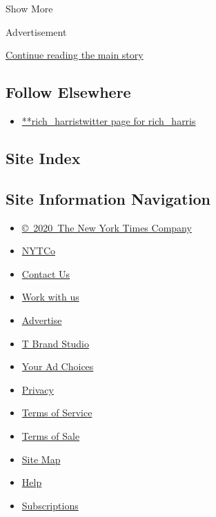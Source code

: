 Show More

Advertisement

\protect\hyperlink{after-mid2}{Continue reading the main story}

\hypertarget{follow-elsewhere}{%
\subsection{Follow Elsewhere}\label{follow-elsewhere}}

\begin{itemize}
\tightlist
\item
  \href{https://twitter.com/rich_harris}{**rich\_harristwitter page for
  rich\_harris}
\end{itemize}

\hypertarget{site-index}{%
\subsection{Site Index}\label{site-index}}

\hypertarget{site-information-navigation}{%
\subsection{Site Information
Navigation}\label{site-information-navigation}}

\begin{itemize}
\tightlist
\item
  \href{https://help.nytimes.com/hc/en-us/articles/115014792127-Copyright-notice}{©~2020~The
  New York Times Company}
\end{itemize}

\begin{itemize}
\tightlist
\item
  \href{https://www.nytco.com/}{NYTCo}
\item
  \href{https://help.nytimes.com/hc/en-us/articles/115015385887-Contact-Us}{Contact
  Us}
\item
  \href{https://www.nytco.com/careers/}{Work with us}
\item
  \href{https://nytmediakit.com/}{Advertise}
\item
  \href{http://www.tbrandstudio.com/}{T Brand Studio}
\item
  \href{https://www.nytimes.com/privacy/cookie-policy\#how-do-i-manage-trackers}{Your
  Ad Choices}
\item
  \href{https://www.nytimes.com/privacy}{Privacy}
\item
  \href{https://help.nytimes.com/hc/en-us/articles/115014893428-Terms-of-service}{Terms
  of Service}
\item
  \href{https://help.nytimes.com/hc/en-us/articles/115014893968-Terms-of-sale}{Terms
  of Sale}
\item
  \href{https://spiderbites.nytimes.com}{Site Map}
\item
  \href{https://help.nytimes.com/hc/en-us}{Help}
\item
  \href{https://www.nytimes.com/subscription?campaignId=37WXW}{Subscriptions}
\end{itemize}
